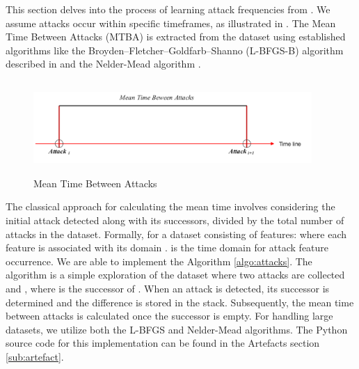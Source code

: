 This section delves into the process of learning attack frequencies from . We assume attacks occur within specific timeframes, as illustrated in . The Mean Time Between Attacks (MTBA) is extracted from the dataset using established algorithms like the Broyden–Fletcher–Goldfarb–Shanno (L-BFGS-B) algorithm described in \cite{liu1989limited} and the Nelder-Mead algorithm \cite{nelder1965simplex}. 



\begin{figure}[h]
\noindent
     \centering
		\includegraphics[width=300pt, height =100pt]{timeline.pdf}
		\caption{Mean Time Between Attacks}
	\label{attacks}
\end{figure}




The classical approach for calculating the mean time involves considering the initial attack detected along with its successors, divided by the total number of attacks in the dataset. Formally, for a dataset consisting of  features:   where each feature is associated with its domain .  is the time domain for attack feature occurrence. We are able to implement the Algorithm \ref{algo:attacks}. The algorithm is a simple exploration of the dataset where two attacks are collected  and , where  is the successor of . When an attack is detected, its successor is determined and the difference is stored in the stack. Subsequently, the mean time between attacks is calculated once the successor is empty. For handling large datasets, we utilize both the L-BFGS and Nelder-Mead algorithms. The Python source code for this implementation can be found in the Artefacts section \ref{sub:artefact}.

